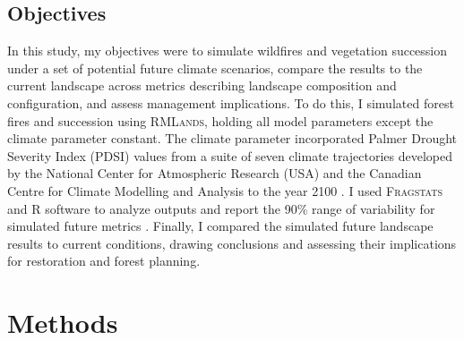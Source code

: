 \subsection*{Objectives}
In this study, my objectives were to simulate wildfires and vegetation succession under a set of potential future climate scenarios, compare the results to the current landscape across metrics describing landscape composition and configuration, and assess management implications. To do this, I simulated forest fires and succession using \textsc{RMLands}, holding all model parameters except the climate parameter constant. The climate parameter incorporated Palmer Drought Severity Index (PDSI) values from a suite of seven climate trajectories developed by the National Center for Atmospheric Research (USA) and the Canadian Centre for Climate Modelling and Analysis to the year 2100 \citep{Cook2014}. I used \textsc{Fragstats} and R software to analyze outputs and report the 90\% range of variability for simulated future metrics \citep{Fragstats2012,RCoreTeam2013}. Finally, I compared the simulated future landscape results to current conditions, drawing conclusions and assessing their implications for restoration and forest planning.






\section{Methods}

